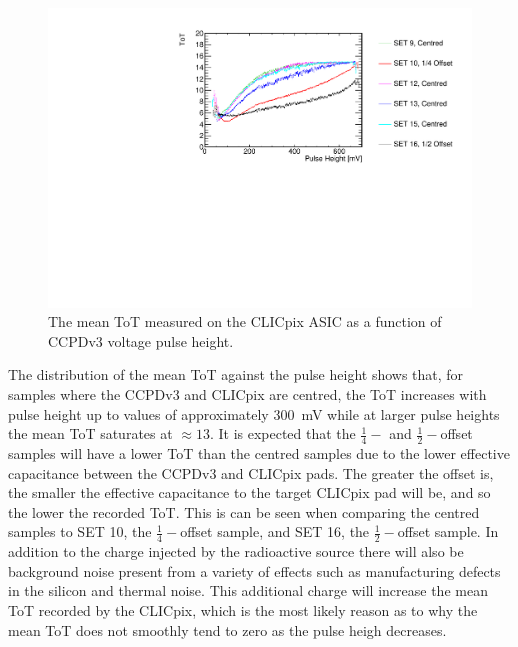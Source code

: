 \begin{figure}[h!]
\centering
\includegraphics[width=1.0\textwidth]{CLICdpVertex/Plots/RadSourceAnalysis/AllSETs_TargetTot_PulseHeight.pdf}
\caption[The mean ToT measured on the CLICpix ASIC as a function of CCPDv3 voltage pulse height.]{The mean ToT measured on the CLICpix ASIC as a function of CCPDv3 voltage pulse height.}
\label{fig:tot}
\end{figure}

The distribution of the mean ToT against the pulse height shows that, for samples where the CCPDv3 and CLICpix are centred, the ToT increases with pulse height up to values of approximately 300~mV while at larger pulse heights the mean ToT saturates at $\approx 13$.  It is expected that the $\frac{1}{4}-$ and $\frac{1}{2}-$offset samples will have a lower ToT than the centred samples due to the lower effective capacitance between the CCPDv3 and CLICpix pads.  The greater the offset is, the smaller the effective capacitance to the target CLICpix pad will be, and so the lower the recorded ToT.  This is can be seen when comparing the centred samples to SET 10, the $\frac{1}{4}-$offset sample, and SET 16, the $\frac{1}{2}-$offset sample.  In addition to the charge injected by the radioactive source there will also be background noise present from a variety of effects such as manufacturing defects in the silicon and thermal noise.  This additional charge will increase the mean ToT recorded by the CLICpix, which is the most likely reason as to why the mean ToT does not smoothly tend to zero as the pulse heigh decreases.


